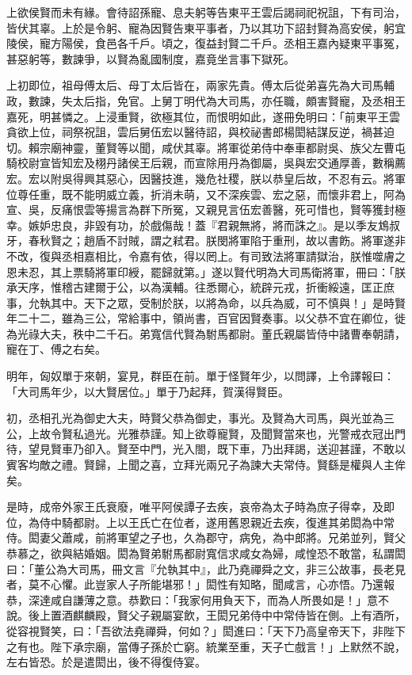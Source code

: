 \begin{pinyinscope}
上欲侯賢而未有緣。會待詔孫寵、息夫躬等告東平王雲后謁祠祀祝詛，下有司治，皆伏其辜。上於是令躬、寵為因賢告東平事者，乃以其功下詔封賢為高安侯，躬宜陵侯，寵方陽侯，食邑各千戶。頃之，復益封賢二千戶。丞相王嘉內疑東平事冤，甚惡躬等，數諫爭，以賢為亂國制度，嘉竟坐言事下獄死。

上初即位，祖母傅太后、母丁太后皆在，兩家先貴。傅太后從弟喜先為大司馬輔政，數諫，失太后指，免官。上舅丁明代為大司馬，亦任職，頗害賢寵，及丞相王嘉死，明甚憐之。上浸重賢，欲極其位，而恨明如此，遂冊免明曰：「前東平王雲貪欲上位，祠祭祝詛，雲后舅伍宏以醫待詔，與校祕書郎楊閎結謀反逆，禍甚迫切。賴宗廟神靈，董賢等以聞，咸伏其辜。將軍從弟侍中奉車都尉吳、族父左曹屯騎校尉宣皆知宏及栩丹諸侯王后親，而宣除用丹為御屬，吳與宏交通厚善，數稱薦宏。宏以附吳得興其惡心，因醫技進，幾危社稷，朕以恭皇后故，不忍有云。將軍位尊任重，既不能明威立義，折消未萌，又不深疾雲、宏之惡，而懷非君上，阿為宣、吳，反痛恨雲等揚言為群下所冤，又親見言伍宏善醫，死可惜也，賢等獲封極幸。嫉妒忠良，非毀有功，於戲傷哉！蓋『君親無將，將而誅之』。是以季友鴆叔牙，春秋賢之；趙盾不討賊，謂之弒君。朕閔將軍陷于重刑，故以書飭。將軍遂非不改，復與丞相嘉相比，令嘉有依，得以罔上。有司致法將軍請獄治，朕惟噬膚之恩未忍，其上票騎將軍印綬，罷歸就第。」遂以賢代明為大司馬衛將軍，冊曰：「朕承天序，惟稽古建爾于公，以為漢輔。往悉爾心，統辟元戎，折衝綏遠，匡正庶事，允執其中。天下之眾，受制於朕，以將為命，以兵為威，可不慎與！」是時賢年二十二，雖為三公，常給事中，領尚書，百官因賢奏事。以父恭不宜在卿位，徙為光祿大夫，秩中二千石。弟寬信代賢為駙馬都尉。董氏親屬皆侍中諸曹奉朝請，寵在丁、傅之右矣。

明年，匈奴單于來朝，宴見，群臣在前。單于怪賢年少，以問譯，上令譯報曰：「大司馬年少，以大賢居位。」單于乃起拜，賀漢得賢臣。

初，丞相孔光為御史大夫，時賢父恭為御史，事光。及賢為大司馬，與光並為三公，上故令賢私過光。光雅恭謹。知上欲尊寵賢，及聞賢當來也，光警戒衣冠出門待，望見賢車乃卻入。賢至中門，光入閤，既下車，乃出拜謁，送迎甚謹，不敢以賓客均敵之禮。賢歸，上聞之喜，立拜光兩兄子為諫大夫常侍。賢繇是權與人主侔矣。

是時，成帝外家王氏衰廢，唯平阿侯譚子去疾，哀帝為太子時為庶子得幸，及即位，為侍中騎都尉。上以王氏亡在位者，遂用舊恩親近去疾，復進其弟閎為中常侍。閎妻父蕭咸，前將軍望之子也，久為郡守，病免，為中郎將。兄弟並列，賢父恭慕之，欲與結婚姻。閎為賢弟駙馬都尉寬信求咸女為婦，咸惶恐不敢當，私謂閎曰：「董公為大司馬，冊文言『允執其中』，此乃堯禪舜之文，非三公故事，長老見者，莫不心懼。此豈家人子所能堪邪！」閎性有知略，聞咸言，心亦悟。乃還報恭，深達咸自謙薄之意。恭歎曰：「我家何用負天下，而為人所畏如是！」意不說。後上置酒麒麟殿，賢父子親屬宴飲，王閎兄弟侍中中常侍皆在側。上有酒所，從容視賢笑，曰：「吾欲法堯禪舜，何如？」閎進曰：「天下乃高皇帝天下，非陛下之有也。陛下承宗廟，當傳子孫於亡窮。統業至重，天子亡戲言！」上默然不說，左右皆恐。於是遣閎出，後不得復侍宴。


\end{pinyinscope}
